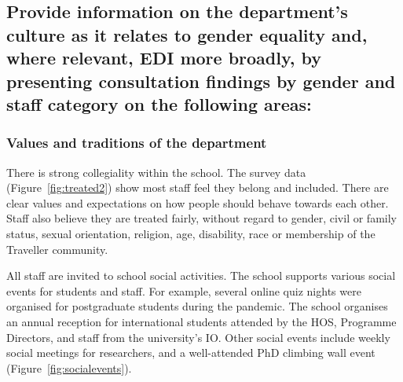 \subsection{Provide information on the department’s culture as it relates to gender equality and, where relevant, EDI more broadly, by presenting consultation findings by gender and staff category on the following areas:}

\subsubsection{Values and traditions of the department}
There is strong collegiality within the school. The survey data (Figure~\ref{fig:treated2}) show most staff feel they belong and included. There are clear values and expectations on how people should behave towards each other. Staff also believe they are treated fairly, without regard to gender, civil or family status, sexual orientation, religion, age, disability, race or membership of the Traveller community.




All staff  are invited to school social activities. The school supports various social events for students and staff. For example, several online quiz nights were organised for postgraduate students during the pandemic. The school organises an annual reception for international students attended by the \ac{HOS}, Programme Directors, and staff from the university's \ac{IO}. 
Other social events include weekly social meetings for researchers, and a well-attended PhD climbing wall event (Figure~\ref{fig:socialevents}). 

